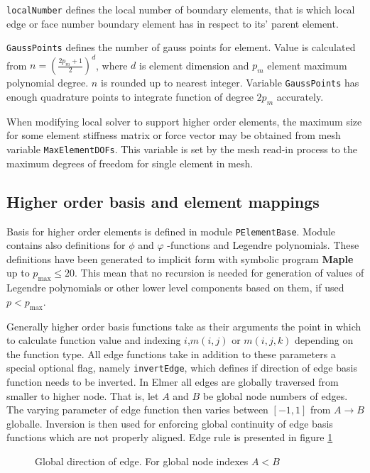 \texttt{localNumber} defines the local number of boundary elements, that is which local edge or face number boundary element has in respect to its' parent element. 

\texttt{GaussPoints} defines the number of gauss points for element. Value is calculated from $n=(\frac{2p_m+1}{2})^d$, where $d$ is element dimension and $p_m$ element maximum polynomial degree. $n$ is rounded up to nearest integer. Variable \texttt{GaussPoints} has enough quadrature points to integrate function of degree $2p_m$ accurately. 

When modifying local solver to support higher order elements, the maximum size for some element stiffness matrix or force vector may be obtained from mesh variable \texttt{MaxElementDOFs}. This variable is set by the mesh read-in process to the maximum degrees of freedom for single element in mesh.  

\subsection{Higher order basis and element mappings}

Basis for higher order elements is defined in module \texttt{PElementBase}. Module contains also definitions for $\phi$ and $\varphi$ -functions and Legendre polynomials. These definitions have been generated to implicit form with symbolic program \textbf{Maple} \cite{Maple} up to $p_{\max}\leq 20$. This mean that no recursion is needed for generation of values of Legendre polynomials or other lower level components based on them, if used $p<p_{\max}$. 

Generally higher order basis functions take as their arguments the point in which to calculate function value and indexing $i$,$m(i,j)$ or $m(i,j,k)$ depending on the function type. All edge functions take in addition to these parameters a special optional flag, namely \texttt{invertEdge}, which defines if direction of edge basis function needs to be inverted. In Elmer all edges are globally traversed from smaller to higher node. That is, let $A$ and $B$ be global node numbers of edges. The varying parameter of edge function then varies between $[-1,1]$ from $A \rightarrow B$ globalle. Inversion is then used for enforcing global continuity of edge basis functions which are not properly aligned.  Edge rule is presented in figure \ref{fig:parityedge}

\begin{figure}[tbhp]
\begin{center}
\label{fig:parityedge}

\end{center}
\caption{Global direction of edge. For global node indexes $A<B$}
\end{figure}

